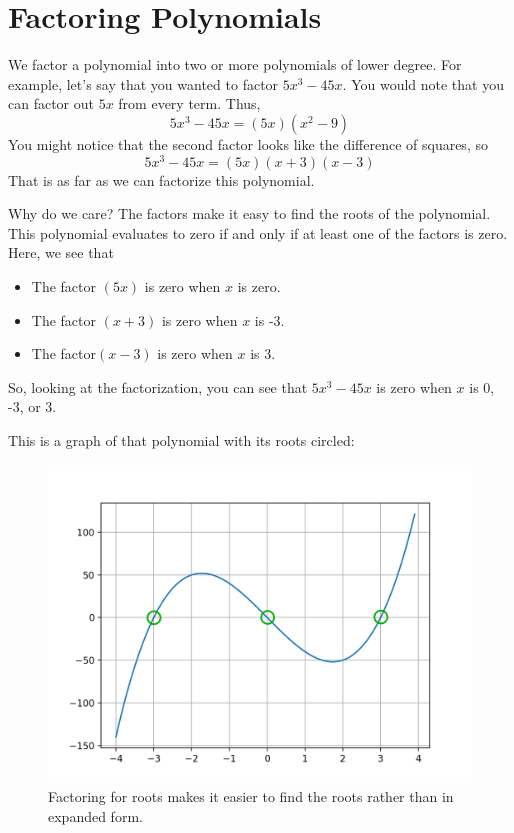 \chapter{Factoring Polynomials}

We factor a polynomial into two or more polynomials of lower
degree. For example, let's say that you wanted to factor
$5x^3 - 45x$. You would note that you can factor out $5x$ from every term. Thus,
\begin{equation*}
5x^3 - 45x = (5x)(x^2 - 9)
\end{equation*}
You might notice that the second factor looks like the difference of squares, so
\begin{equation*}
5x^3 - 45x = (5x)(x + 3)(x - 3)
\end{equation*}
That is as far as we can factorize this polynomial.

Why do we care? The factors make it easy to find the roots of the
polynomial. This polynomial evaluates to zero if and only if at least
one of the factors is zero. Here, we see that
\begin{itemize}
\item The factor $(5x)$ is zero when $x$ is zero.
\item The factor $(x + 3)$ is zero when $x$ is -3.
\item The factor$(x - 3)$ is zero when $x$ is 3.
\end{itemize}
So, looking at the factorization, you can see
that $5x^3 - 45x$ is zero when $x$ is 0, -3, or 3. 

This is a graph of that polynomial with its roots circled:

\begin{figure}[htbp]
    \centering
    \includegraphics{factor4roots.png}
    \caption{Factoring for roots makes it easier to find the roots rather than in expanded form.}
    \label{fig:factor4roots}
\end{figure}

